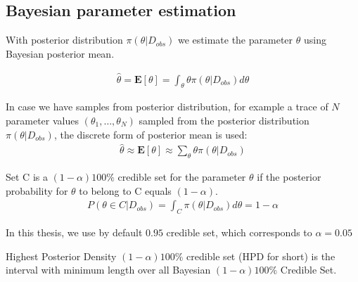 \subsection{Bayesian parameter estimation}
With posterior distribution $\pi(\theta|D_{obs})$ we estimate the parameter $\hat{\theta}$ using Bayesian
posterior mean.
\begin{definition}
    \rm
    \begin{align*}
        \hat{\theta} = \mathbf{E}[\theta] = \int_\theta \theta \pi(\theta|D_{obs}) d\theta
    \end{align*}
\end{definition}
In case we have samples from posterior distribution, for example a trace of $N$ parameter values
$(\theta_1,\ldots,\theta_N)$ sampled from the posterior distribution $\pi(\theta|D_{obs})$, the
discrete form of posterior mean is used:
\begin{align*}
    \hat{\theta} \approx \mathbf{E}[\theta] \approx \sum_\theta \theta \pi(\theta|D_{obs})
\end{align*}

\begin{definition}
    Set C is a $(1 − \alpha )100\%$ credible set for the parameter $\theta$ if the posterior
    probability for $\theta$ to belong to C equals $(1 − \alpha)$.
    \begin{align*}
        P(\theta \in C | D_{obs}) = \int_C \pi(\theta|D_{obs}) d\theta = 1 - \alpha
    \end{align*}
\end{definition}
In this thesis, we use by default $0.95$ credible set, which corresponds to $\alpha=0.05$
\begin{definition}
    Highest Posterior Density $(1-\alpha)100\%$ credible set (HPD for short) is the
    interval with minimum length over all Bayesian $(1-\alpha)100\%$ Credible Set.
\end{definition}


